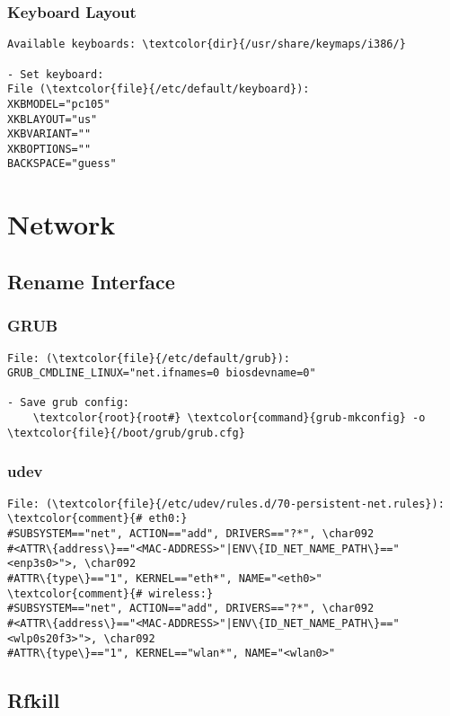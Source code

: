 \documentclass[10pt, a4paper, onecolumn, openany]{book} %
\begin{document}
\subsection{Keyboard Layout}
\begin{Verbatim}[commandchars=\\\{\}]
Available keyboards: \textcolor{dir}{/usr/share/keymaps/i386/}

- Set keyboard:
File (\textcolor{file}{/etc/default/keyboard}):
XKBMODEL="pc105"
XKBLAYOUT="us"
XKBVARIANT=""
XKBOPTIONS=""
BACKSPACE="guess"
\end{Verbatim}


\chapter{Network}
\section{Rename Interface}
\subsection{GRUB}
\begin{Verbatim}[commandchars=\\\{\}]
File: (\textcolor{file}{/etc/default/grub}):
GRUB_CMDLINE_LINUX="net.ifnames=0 biosdevname=0"

- Save grub config:
    \textcolor{root}{root#} \textcolor{command}{grub-mkconfig} -o \textcolor{file}{/boot/grub/grub.cfg}
\end{Verbatim}

\subsection{udev}
\begin{Verbatim}[commandchars=\\\{\}]
File: (\textcolor{file}{/etc/udev/rules.d/70-persistent-net.rules}):
\textcolor{comment}{# eth0:}
#SUBSYSTEM=="net", ACTION=="add", DRIVERS=="?*", \char092
#<ATTR\{address\}=="<MAC-ADDRESS>"|ENV\{ID_NET_NAME_PATH\}=="<enp3s0>">, \char092
#ATTR\{type\}=="1", KERNEL=="eth*", NAME="<eth0>"
\textcolor{comment}{# wireless:}
#SUBSYSTEM=="net", ACTION=="add", DRIVERS=="?*", \char092
#<ATTR\{address\}=="<MAC-ADDRESS>"|ENV\{ID_NET_NAME_PATH\}=="<wlp0s20f3>">, \char092
#ATTR\{type\}=="1", KERNEL=="wlan*", NAME="<wlan0>"
\end{Verbatim}


\section{Rfkill}
\end{document}

